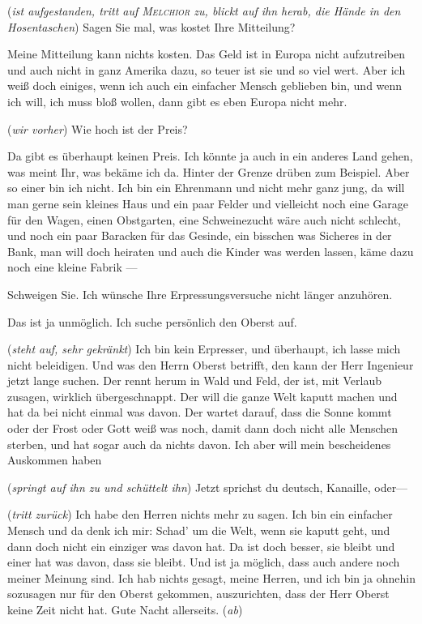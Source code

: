 \documentclass[
	final,
	a4paper,
	ngerman,
	mpinclude = true, %
	twoside = true,
	open = right,
	cleardoublepage = plain,
	DIV = 13,
	BCOR = 1cm,
	titlepage = firstiscover,
	]{scrbook}
\newcommand{\direction}[1]{(\textit{#1})}
\newcommand{\thecharacter}[1]{\textup{\textsc{#1}}\xspace}
\newcommand{\theAlexis}{\thecharacter{Alexis}}
\newcommand{\theJonas}{\thecharacter{Jonas}}
\newcommand{\theMelchior}{\thecharacter{Melchior}}
\newcommand{\character}[1]{\item[#1]}
\newcommand{\Generaldirektor}{\character{Direktor}}
\newcommand{\Alexis}{\character{\theAlexis}}
\newcommand{\Jonas}{\character{\theJonas}}
\newcommand{\Melchior}{\character{\theMelchior}}
\begin{document}
\begin{play}
\Jonas
\direction{ist aufgestanden, tritt auf \theMelchior zu, blickt auf ihn herab, die Hände in den Hosentaschen} Sagen Sie mal, was kostet Ihre Mitteilung?

\Melchior
Meine Mitteilung kann nichts kosten. Das Geld ist in Europa nicht aufzutreiben und auch nicht in ganz Amerika dazu, so teuer ist sie und so viel wert. Aber ich weiß doch einiges, wenn ich auch ein einfacher Mensch geblieben bin, und wenn ich will, ich muss bloß wollen, dann gibt es eben Europa nicht mehr.

\Jonas
\direction{wir vorher} Wie hoch ist der Preis?

\Melchior
Da gibt es überhaupt keinen Preis. Ich könnte ja auch in ein anderes Land gehen, was meint Ihr, was bekäme ich da. Hinter der Grenze drüben zum Beispiel. Aber so einer bin ich nicht. Ich bin ein Ehrenmann und nicht mehr ganz jung, da will man gerne sein kleines Haus und ein paar Felder und vielleicht noch eine Garage für den Wagen, einen Obstgarten, eine Schweinezucht wäre auch nicht schlecht, und noch ein paar Baracken für das Gesinde, ein bisschen was Sicheres in der Bank, man will doch heiraten und auch die Kinder was werden lassen, käme dazu noch eine kleine Fabrik ---

\Generaldirektor
Schweigen Sie. Ich wünsche Ihre Erpressungsversuche nicht länger anzuhören.

\Alexis
Das ist ja unmöglich. Ich suche persönlich den Oberst auf.

\Melchior
\direction{steht auf, sehr gekränkt} Ich bin kein Erpresser, und überhaupt, ich lasse mich nicht beleidigen. Und was den Herrn Oberst betrifft, den kann der Herr Ingenieur jetzt lange suchen. Der rennt herum in Wald und Feld, der ist, mit Verlaub zusagen, wirklich übergeschnappt. Der will die ganze Welt kaputt machen und hat da bei nicht einmal was davon. Der wartet darauf, dass die Sonne kommt oder der Frost oder Gott weiß was noch, damit dann doch nicht alle Menschen sterben, und hat sogar auch da nichts davon. Ich aber will mein bescheidenes Auskommen haben

\Alexis
\direction{springt auf ihn zu und schüttelt ihn} Jetzt sprichst du deutsch, Kanaille, oder---

\Melchior
\direction{tritt zurück} Ich habe den Herren nichts mehr zu sagen. Ich bin ein einfacher Mensch und da denk ich mir: Schad' um die Welt, wenn sie kaputt geht, und dann doch nicht ein einziger was davon hat. Da ist doch besser, sie bleibt und einer hat was davon, dass sie bleibt. Und ist ja möglich, dass auch andere noch meiner Meinung sind. Ich hab nichts gesagt, meine Herren, und ich bin ja ohnehin sozusagen nur für den Oberst gekommen, auszurichten, dass der Herr Oberst keine Zeit nicht hat. Gute Nacht allerseits. \direction{ab}


\end{play}
\end{document}
